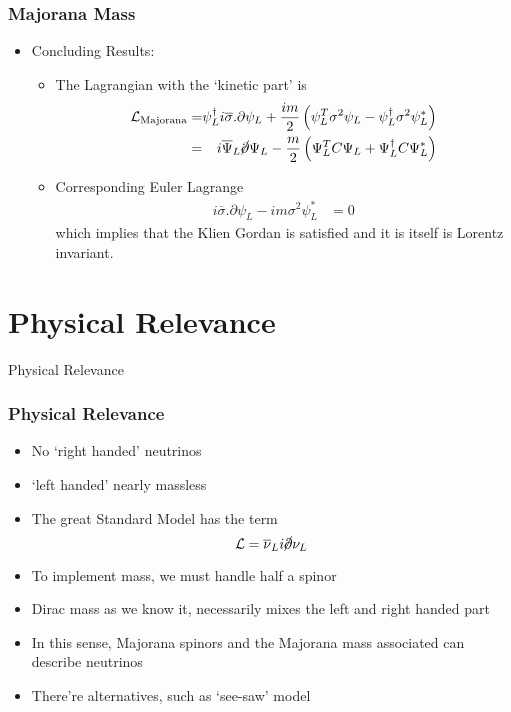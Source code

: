 \documentclass{beamer}
\begin{document}
 
\begin{frame}
	\frametitle{Majorana Mass}
	\begin{itemize}
		\item Concluding Results:
		\begin{itemize}
		\pause
		\item The Lagrangian with the `kinetic part' is
		\pause
		\[
		\begin{alignedat}{2}\mathcal{L}_{\text{Majorana}} & = & \psi_{L}^{\dagger}i\overline{\sigma}.\partial\psi_{L}+\frac{im}{2}\left(\psi_{L}^{T}\sigma^{2}\psi_{L}-\psi_{L}^{\dagger}\sigma^{2}\psi_{L}^{*}\right)\\
		 & = & i\overline{\Psi}_{L}\cancel{\partial}\Psi_{L}-\frac{m}{2}\left(\Psi_{L}^{T}C\Psi_{L}+\Psi_{L}^{\dagger}C\Psi_{L}^{*}\right)
		\end{alignedat}
		\]
		\pause
		\item Corresponding Euler Lagrange
		\pause
		\[
		\begin{aligned}i\overline{\sigma}.\partial\psi_{L}-im\sigma^{2}\psi_{L}^{*} & =0\end{aligned}
		\]
		\pause
		which implies that the Klien Gordan is satisfied and \pause it is itself is Lorentz invariant.
		\end{itemize}



	\end{itemize}
\end{frame}

 








\section{Physical Relevance}
\begin{frame}	
	\Huge{\centerline{Physical Relevance}}
\end{frame}

 
\begin{frame}
	\frametitle{Physical Relevance}
	\begin{itemize}
		\item No `right handed' neutrinos
		\pause
		\item `left handed' nearly massless
		\pause
		\item The great Standard Model has the term 
		\pause
\[
\mathcal{L}=\overline{\nu}_{L}i\cancel{\partial}\nu_{L}
\]
		\pause
		\item To implement mass, we must handle half a spinor
		\pause
		\item Dirac mass as we know it, necessarily mixes the left and right handed part
		\pause
		\item In this sense, Majorana spinors and the Majorana mass associated can describe neutrinos
		\pause
		\item There're alternatives, such as `see-saw' model

	\end{itemize}
\end{frame}
\end{document}
